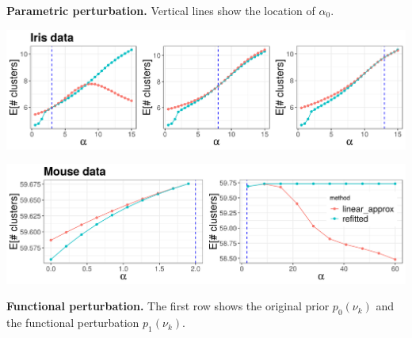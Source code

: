 \documentclass[a0,plainsections,30pt]{sciposter}\usepackage[]{graphicx}\usepackage[]{color}
\newenvironment{knitrout}{}{} %
\begin{document}
\begin{minipage}[t]{0.45\textwidth}
\textbf{Parametric perturbation.}
Vertical lines show the location of $\alpha_0$.

\vspace{0.05in}
%

\begin{knitrout}
\color{fgcolor}

{\centering \includegraphics[width=0.98\linewidth,height=0.294\linewidth]{figure/param_sens_plot-1} 

}



\end{knitrout}

\begin{knitrout}
\color{fgcolor}

{\centering \includegraphics[width=0.98\linewidth,height=0.294\linewidth]{figure/gene_param_sens_plot-1} 

}



\end{knitrout}

\textbf{Functional perturbation.} The first row shows the original prior
$p_0(\nu_k)$ and the functional perturbation $p_1(\nu_k)$.

\vspace{0.1in}

\begin{knitrout}
\color{fgcolor}


\end{knitrout}
\end{minipage}
\end{document}
